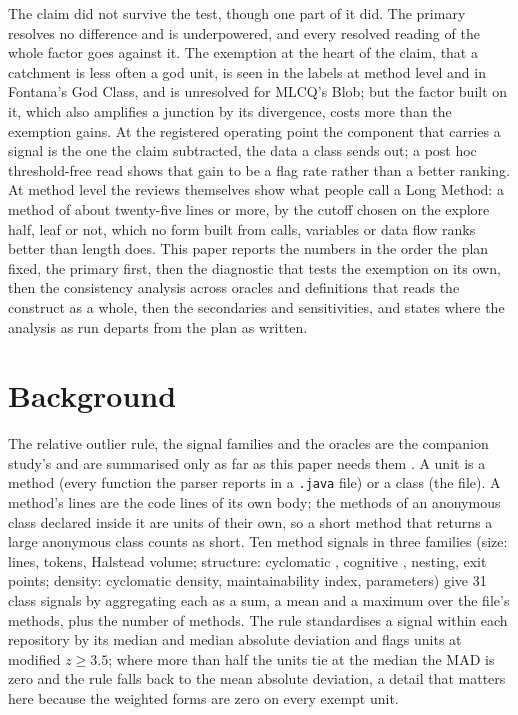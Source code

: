 \documentclass[11pt,a4paper]{article}
\newcommand{\madz}{modified $z \geq 3.5$}
\begin{document}
The claim did not survive the test, though one part of it did. The primary
resolves no difference and is underpowered, and every resolved reading of
the whole factor goes against it. The exemption at the heart of the claim,
that a catchment is less often a god unit, is seen in the labels at method
level and in Fontana's God Class, and is unresolved for MLCQ's Blob; but the
factor built on it, which also amplifies a junction by its divergence, costs
more than the exemption gains. At the registered operating point the component that carries a signal is
the one the claim subtracted, the data a class sends out; a post hoc threshold-free read shows that gain to be a flag rate rather
than a better ranking. At method level the reviews themselves show what
people call a Long Method: a method of about twenty-five lines or more,
\lwLengthCutoff{} by the cutoff chosen on the explore half, leaf or not,
which no form built from calls, variables or data flow ranks better than
length does. This paper reports the
numbers in the order the plan fixed, the primary first, then the
diagnostic that tests the exemption on its own, then the consistency
analysis across oracles and definitions that reads the construct as a
whole, then the secondaries and sensitivities, and states where the
analysis as run departs from the plan as written.

\section{Background}

The relative outlier rule, the signal families and the oracles are the
companion study's and are summarised only as far as this paper needs them
\cite{paperone}. A unit is a method (every function the parser reports in a
\texttt{.java} file) or a class (the file). A method's lines are the code
lines of its own body; the methods of an anonymous class declared inside it
are units of their own, so a short method that returns a large anonymous
class counts as short. Ten method signals in three
families (size: lines, tokens, Halstead volume; structure: cyclomatic
\cite{mcCabe1976}, cognitive \cite{campbell2018}, nesting, exit points;
density: cyclomatic density, maintainability index, parameters) give 31
class signals by aggregating each as a sum, a mean and a maximum over the
file's methods, plus the number of methods. The rule standardises a signal
within each repository by its median and median absolute deviation and
flags units at \madz{}; where more than half the units tie at the median
the MAD is zero and the rule falls back to the mean absolute deviation, a
detail that matters here because the weighted forms are zero on every
exempt unit.
\end{document}
